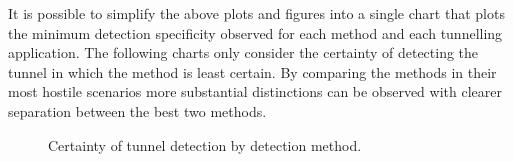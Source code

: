 \documentclass{llncs}
\begin{document}
It is possible to simplify the above plots and figures into a single chart that
plots the minimum detection specificity observed for each method and each
tunnelling application. The following charts only consider the certainty of
detecting the tunnel in which the method is least certain. By comparing the
methods in their most hostile scenarios more substantial distinctions can be
observed with clearer separation between the best two methods.

\begin{figure}[h]
\centering
{}
\caption{Certainty of tunnel detection by detection method.}
\end{figure}
\end{document}
